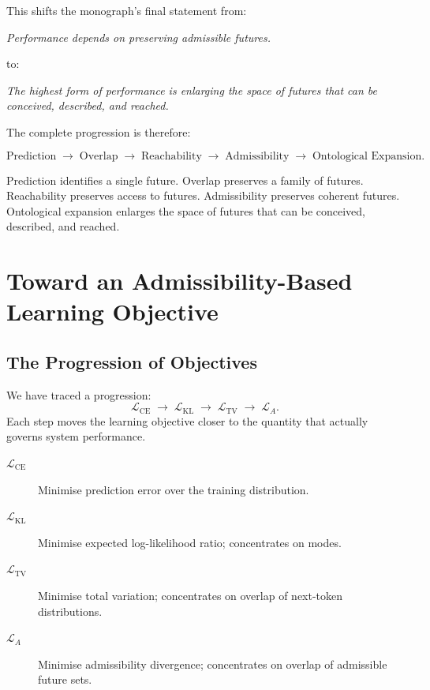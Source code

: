 \documentclass[11pt, a4paper, openany]{book}
\theoremstyle{plain}
\theoremstyle{definition}
\theoremstyle{remark}
\begin{document}
This shifts the monograph's final statement from:
\begin{center}
  \emph{Performance depends on preserving admissible futures.}
\end{center}
to:
\begin{center}
  \emph{The highest form of performance is enlarging the space of futures
  that can be conceived, described, and reached.}
\end{center}

The complete progression is therefore:

\[
  \text{Prediction}
  \;\to\; \text{Overlap}
  \;\to\; \text{Reachability}
  \;\to\; \text{Admissibility}
  \;\to\; \text{Ontological Expansion}.
\]

Prediction identifies a single future.
Overlap preserves a family of futures.
Reachability preserves access to futures.
Admissibility preserves coherent futures.
Ontological expansion enlarges the space of futures that can be conceived,
described, and reached.

\chapter{Toward an Admissibility-Based Learning Objective}
\label{ch:objective}

\section{The Progression of Objectives}

We have traced a progression:
\[
  \mathcal{L}_{\mathrm{CE}} \;\to\; \mathcal{L}_{\mathrm{KL}}
  \;\to\; \mathcal{L}_{\mathrm{TV}} \;\to\; \mathcal{L}_A.
\]
Each step moves the learning objective closer to the quantity that actually
governs system performance.

\begin{description}
  \item[$\mathcal{L}_{\mathrm{CE}}$] Minimise prediction error over the
    training distribution.
  \item[$\mathcal{L}_{\mathrm{KL}}$] Minimise expected log-likelihood ratio;
    concentrates on modes.
  \item[$\mathcal{L}_{\mathrm{TV}}$] Minimise total variation; concentrates
    on overlap of next-token distributions.
  \item[$\mathcal{L}_A$] Minimise admissibility divergence; concentrates
    on overlap of admissible future sets.
\end{description}
\end{document}
